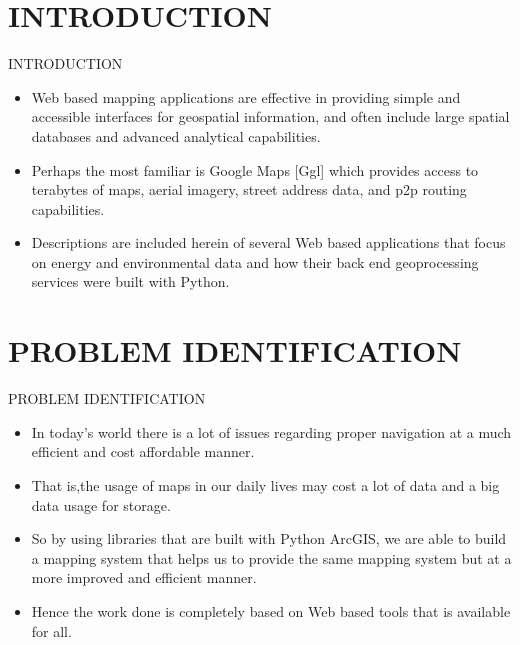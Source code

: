 \documentclass[svgnames,9pt]{beamer}
\begin{document}
\section{INTRODUCTION}
\begin{frame}{INTRODUCTION}
\begin{itemize}
\justifying \item Web based mapping applications are effective in providing
simple and accessible interfaces for geospatial information,
and often include large spatial databases and advanced analytical capabilities. 
\item Perhaps the most familiar is Google Maps [Ggl] which provides access to terabytes of maps,
aerial imagery, street address data, and p2p routing
capabilities. 
\item Descriptions are included herein of several Web based applications that focus on energy and environmental data
and how their back end geoprocessing services were built with
Python.
\end{itemize}
\end{frame}

\section{PROBLEM IDENTIFICATION}
\begin{frame}{PROBLEM IDENTIFICATION}
\begin{itemize}
\justifying \item In today's world there is a lot of issues regarding proper navigation at a much efficient and cost affordable manner. 
\item That is,the usage of maps in our daily lives may cost a lot of data and a big data usage for storage.
\item So by using libraries that are built with Python ArcGIS, we are able to build a mapping system that helps us to provide the same mapping system but at a more improved and efficient manner.
\item Hence the work done is completely based on Web based tools that is available for all.
\end{itemize}
\end{frame}
\end{document}
